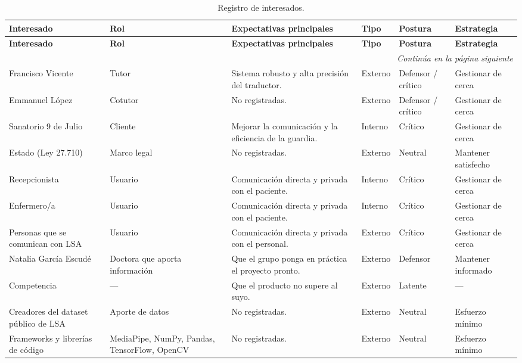 {\footnotesize
\begin{longtable}{@{}p{2.7cm}p{2.0cm}p{3.6cm}p{1.4cm}p{2.0cm}p{2.0cm}@{}}
\caption{Registro de interesados.}\label{tab:interesados}\\
\toprule
\textbf{Interesado} & \textbf{Rol} & \textbf{Expectativas principales} & \textbf{Tipo} & \textbf{Postura} & \textbf{Estrategia} \\
\midrule
\endfirsthead
\toprule
\textbf{Interesado} & \textbf{Rol} & \textbf{Expectativas principales} & \textbf{Tipo} & \textbf{Postura} & \textbf{Estrategia} \\
\midrule
\endhead
\midrule
\multicolumn{6}{r}{\emph{Continúa en la página siguiente}}\\
\endfoot
\bottomrule
\endlastfoot
Francisco Vicente & Tutor & Sistema robusto y alta precisión del traductor. & Externo & Defensor / crítico & Gestionar de cerca \\
Emmanuel López & Cotutor & No registradas. & Externo & Defensor / crítico & Gestionar de cerca \\
Sanatorio 9 de Julio & Cliente & Mejorar la comunicación y la eficiencia de la guardia. & Interno & Crítico & Gestionar de cerca \\
Estado (Ley 27.710) & Marco legal & No registradas. & Externo & Neutral & Mantener satisfecho \\
Recepcionista & Usuario & Comunicación directa y privada con el paciente. & Interno & Crítico & Gestionar de cerca \\
Enfermero/a & Usuario & Comunicación directa y privada con el paciente. & Interno & Crítico & Gestionar de cerca \\
Personas que se comunican con LSA & Usuario & Comunicación directa y privada con el personal. & Externo & Crítico & Gestionar de cerca \\
Natalia García Escudé & Doctora que aporta información & Que el grupo ponga en práctica el proyecto pronto. & Externo & Defensor & Mantener informado \\
Competencia & --- & Que el producto no supere al suyo. & Externo & Latente & --- \\
Creadores del dataset público de LSA & Aporte de datos & No registradas. & Externo & Neutral & Esfuerzo mínimo \\
Frameworks y librerías de código & MediaPipe, NumPy, Pandas, TensorFlow, OpenCV & No registradas. & Externo & Neutral & Esfuerzo mínimo \\
\end{longtable}
}

